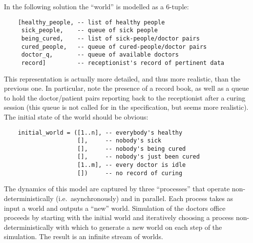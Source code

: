 In the following solution the ``world'' is modelled as a 6-tuple:
\begin{verbatim}
    [healthy_people, -- list of healthy people
     sick_people,    -- queue of sick people
     being_cured,    -- list of sick-people/doctor pairs
     cured_people,   -- queue of cured-people/doctor pairs
     doctor_q,       -- queue of available doctors
     record]         -- receptionist's record of pertinent data
\end{verbatim}
This representation is actually more detailed, and thus more
realistic, than the previous one.  In particular, note the presence of
a record book, as well as a queue to hold the doctor/patient pairs
reporting back to the receptionist after a curing session (this queue
is not called for in the specification, but seems more realistic).
The initial state of the world should be obvious:
\begin{verbatim}
    initial_world = ([1..n], -- everybody's healthy     
                     [],     -- nobody's sick           
                     [],     -- nobody's being cured    
                     [],     -- nobody's just been cured
                     [1..m], -- every doctor is idle    
                     [])     -- no record of curing     
\end{verbatim}

The dynamics of this model are captured by three ``processes'' that
operate non-deter\-ministically (i.e.\ asynchronously) and in
parallel.  Each process takes as input a world and outputs a ``new''
world.  Simulation of the doctors office proceeds by starting with the
initial world and iteratively choosing a process non-deterministically
with which to generate a new world on each step of the simulation.
The result is an infinite stream of worlds.

